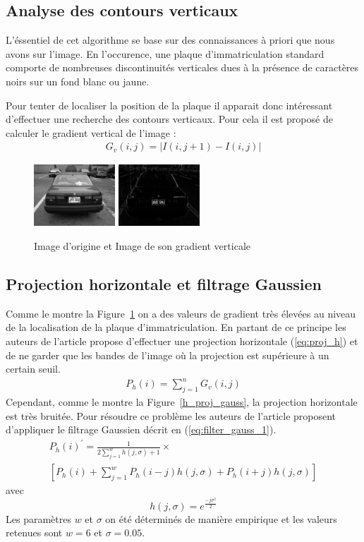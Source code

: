 \documentclass[a4paper,10pt,twocolumn]{article}
\begin{document}
\subsection{Analyse des contours verticaux}
L'éssentiel de cet algorithme se base sur des connaissances à priori que nous avons sur l'image. En l'occurence, une plaque d'immatriculation standard comporte de nombreuses discontinuités verticales dues à la présence de caractères noirs sur un fond blanc ou jaune.

Pour tenter de localiser la position de la plaque il apparait donc intéressant d'effectuer une recherche des contours verticaux. Pour cela il est proposé de calculer le gradient vertical de l'image :
\begin{align}
  G_v(i, j) = |I(i, j + 1) - I(i, j)|
\end{align}
\begin{figure}[H]
	\centering 
	  \includegraphics[width=115px]{img/991213-006.png}
	  \includegraphics[width=115px]{img/991213-006_grad.png}
	\caption{Image d'origine et Image de son gradient verticale\label{grad}}
\end{figure}

\subsection{Projection horizontale et filtrage Gaussien}
Comme le montre la Figure~\ref{grad} on a des valeurs de gradient très élevées au niveau de la localisation de la plaque d'immatriculation. En partant de ce principe les auteurs de l'article propose d'effectuer une projection horizontale (\ref{eq:proj_h}) et de ne garder que les bandes de l'image où la projection est supérieure à un certain seuil.
\begin{align} \label{eq:proj_h}
  P_h(i) = \sum_{j=1}^{n}G_v(i, j)
\end{align}
Cependant, comme le montre la Figure~\ref{h_proj_gauss}, la projection horizontale est très bruitée. Pour résoudre ce problème les auteurs de l'article proposent d'appliquer le filtrage Gaussien décrit en (\ref{eq:filter_gauss_1}).
\begin{gather} \label{eq:filter_gauss_1}
  P_h(i)^{\prime} = \frac{1}{2 \sum_{j = 1}^{w} h(j, \sigma) + 1} \times\\ 
  \left[ P_h(i) + \sum_{j = 1}^{w} P_h(i - j)h(j, \sigma) + P_h(i + j)h(j, \sigma) \right]\nonumber
\end{gather}
avec 
\[ h(j, \sigma) = e^{\frac{-j\sigma^2}{2}} \]
Les paramètres $w$ et $\sigma$ on été déterminés de manière empirique et les valeurs retenues sont $w = 6$ et $\sigma = 0.05$.
\end{document}

